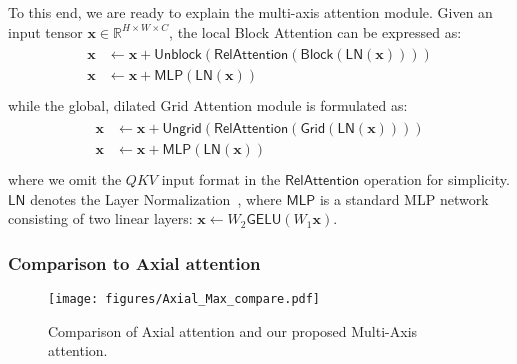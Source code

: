 \documentclass[runningheads]{llncs}
\begin{document}
To this end, we are ready to explain the multi-axis attention module. Given an input tensor $\mathbf{x}\in\mathbb{R}^{H\times W\times C}$, the local Block Attention can be expressed as:
\begin{align}
\begin{split}
\label{eq:multi-axis-attention}
\mathbf{x}&\leftarrow \mathbf{x} + \mathsf{Unblock}(\mathsf{RelAttention}(\mathsf{Block}(\mathsf{LN}(\mathbf{x})))) \\ 
\mathbf{x}&\leftarrow\mathbf{x}+\mathsf{MLP}(\mathsf{LN}(\mathbf{x})) \\
\end{split}
\end{align}
while the global, dilated Grid Attention module is formulated as:
\begin{align}
\begin{split}
\mathbf{x}&\leftarrow \mathbf{x} + \mathsf{Ungrid}(\mathsf{RelAttention}(\mathsf{Grid}(\mathsf{LN}(\mathbf{x})))) \\ 
\mathbf{x}&\leftarrow\mathbf{x}+\mathsf{MLP}(\mathsf{LN}(\mathbf{x})) \\
\end{split}
\end{align}
where we omit the $QKV$ input format in the $\mathsf{RelAttention}$ operation for simplicity. $\mathsf{LN}$ denotes the Layer Normalization~\cite{ba2016layer}, where $\mathsf{MLP}$ is a standard MLP network~\cite{dosovitskiy2020image,liu2021swin} consisting of two linear layers: $\mathbf{x}\leftarrow W_2\mathsf{GELU}(W_1\mathbf{x})$.

\subsubsection{Comparison to Axial attention}
\label{sssec:comparison-axial}

\begin{wrapfigure}{r}{0.5\textwidth}
\begin{center}
\texttt{[image: figures/Axial\_Max\_compare.pdf]}
\end{center}
\vspace{-2mm}
\caption{Comparison of Axial attention and our proposed Multi-Axis attention.}
\label{fig:axial-compare}
\vspace{-4mm}
\end{wrapfigure}
\end{document}
